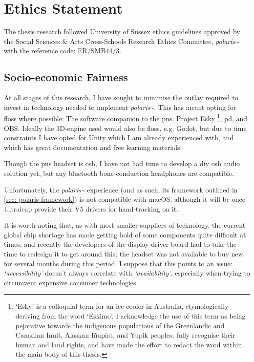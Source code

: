 \section{Ethics Statement}\label{sec: polaris-ethics}
The thesis research followed University of Sussex ethics guidelines approved by the Social Sciences \& Arts Cross-Schools Research Ethics Committee, \textit{polaris\textasciitilde{}} with the reference code: ER/SMB44/3.

\subsection{Socio-economic Fairness}\label{sec: polaris-ethics-}
At all stages of this research, I have sought to minimise the outlay required to invest in technology needed to implement \textit{polaris\textasciitilde{}}. This has meant opting for \gls{floss} where possible: The software companion to the \gls{pns}, Project Esky \footnote{`Esky' is a colloquial term for an ice-cooler in Australia, etymologically deriving from the word `Eskimo'. I acknowledge the use of this term as being pejorative towards the indigenous populations of the Greenlandic and Canadian Inuit, Alaskan Iñupiat, and Yupik peoples; fully recognise their human and land rights, and have made the effort to redact the word within the main body of this thesis.}, \gls{pd}, and OBS. Ideally the 3D-engine used would also be \gls{floss}, e.g. Godot, but due to time constraints I have opted for Unity which I am already experienced with, and which has great documentation and free learning materials.

Though the \gls{pns} headset is \gls{osh}, I have not had time to develop a \gls{diy} \gls{osh} audio solution yet, but any bluetooth bone-conduction headphones are compatible.

Unfortunately, the \textit{polaris\textasciitilde{}} experience (and as such, its framework outlined in \autoref{sec: polaris-framework}) is not compatible with macOS, although it will be once Ultraleap provide their V5 drivers for hand-tracking on it.

It is worth noting that, as with most smaller suppliers of technology, the current global chip shortage has made getting hold of some components quite difficult at times, and recently the developers of the display driver board had to take the time to redesign it to get around this; the headset was not available to buy new for several months during this period. I suppose that this points to an issue: \textit{`accessibility'} doesn't always correlate with \textit{`availability'}, especially when trying to circumvent expensive consumer technologies.

